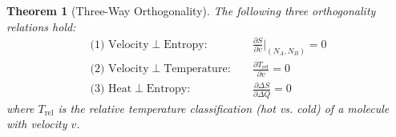 \documentclass[10pt,twocolumn,letterpaper]{article}
\newtheorem{theorem}{Theorem}[section]
\theoremstyle{definition}
\theoremstyle{remark}
\newcommand{\pderiv}[2]{\frac{\partial #1}{\partial #2}}
\begin{document}
\begin{theorem}[Three-Way Orthogonality]
\label{thm:three_way_orthogonality}
The following three orthogonality relations hold:
\begin{align}
\text{(1) Velocity} \perp \text{Entropy}: \quad & \pderiv{S}{v}\bigg|_{(N_A, N_B)} = 0 \label{eq:ortho1} \\
\text{(2) Velocity} \perp \text{Temperature}: \quad & \pderiv{T_{\text{rel}}}{v} = 0 \label{eq:ortho2} \\
\text{(3) Heat} \perp \text{Entropy}: \quad & \pderiv{\Delta S}{\Delta Q} = 0 \label{eq:ortho3}
\end{align}
where $T_{\text{rel}}$ is the relative temperature classification (hot vs. cold) of a molecule with velocity $v$.
\end{theorem}
\end{document}
